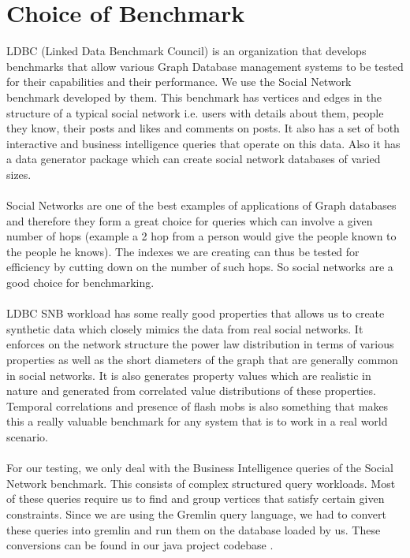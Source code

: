 \section{Choice of Benchmark}
LDBC (Linked Data Benchmark Council)  \cite{benchmark} is an organization that develops benchmarks that allow various Graph Database management systems to be tested for their capabilities and their performance. We use the Social Network benchmark developed by them. This benchmark has vertices and edges in the structure of a typical social network i.e. users with details about them, people they know, their posts and likes and comments on posts. It also has a set of both interactive and business intelligence queries that operate on this data. Also it has a data generator package which can create social network databases of varied sizes.\\
\\
Social Networks are one of the best examples of applications of Graph databases and therefore they form a great choice for queries which can involve a given number of hops (example a 2 hop from a person would give the people known to the people he knows). The indexes we are creating can thus be tested for efficiency by cutting down on the number of such hops. So social networks are a good choice for benchmarking.\\
\\
LDBC SNB workload has some really good properties that allows us to create synthetic data which closely mimics the data from real social networks. It enforces on the network structure the power law distribution in terms of various properties as well as the short diameters of the graph that are generally common in social networks. It is also generates property values which are realistic in nature and generated from correlated value distributions of these properties. Temporal correlations and presence of flash mobs is also something that makes this a really valuable benchmark for any system that is to work in a real world scenario.\\
\\
For our testing, we only deal with the Business Intelligence queries of the Social Network benchmark. This consists of complex structured query workloads.  Most of these queries require us to find and group vertices that satisfy certain given constraints. Since we are using the Gremlin query language, we had to convert these queries into gremlin and run them on the database loaded by us. These conversions can be found in our java project codebase \cite{repo} .

